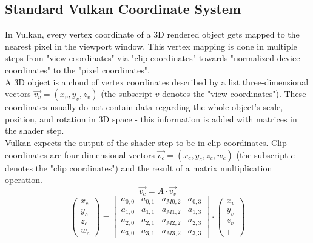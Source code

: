 \subsection{Standard Vulkan Coordinate System}
\label{sec:VulkanCoords}
In Vulkan, every vertex coordinate of a 3D rendered object gets mapped to the nearest pixel in the viewport window. This vertex mapping is done in multiple steps from "view coordinates" via "clip coordinates" towards "normalized device coordinates" to the "pixel coordinates".\\
A 3D object is a cloud of vertex coordinates described by a list three-dimensional vectors $\overrightarrow{v_{v}} = (x_{v},y_{v},z_{v})$ (the subscript $v$ denotes the "view coordinates"). These coordinates usually do not contain data regarding the whole object's scale, position, and rotation in 3D space - this information is added with matrices in the shader step.\\
Vulkan expects the output of the shader step to be in clip coordinates. Clip coordinates are four-dimensional vectors $\overrightarrow{v_{c}} = (x_{c},y_{c},z_{c},w_{c})$ (the subscript $c$ denotes the "clip coordinates") and the result of a matrix multiplication operation.\\
\begin{equation*}
    \overrightarrow{v_{c}} = A \cdot  \overrightarrow{v_{v}}
\end{equation*}
\begin{equation*}
    \begin{pmatrix}
        x_{c} \\
        y_{c} \\
        z_{c} \\
        w_{c}
    \end{pmatrix}
    =
    \begin{bmatrix}
        a_{0,0} & a_{0,1} & a_{M 0,2} & a_{0,3} \\
        a_{1,0} & a_{1,1} & a_{M 1,2} & a_{1,3} \\
        a_{2,0} & a_{2,1} & a_{M 2,2} & a_{2,3} \\
        a_{3,0} & a_{3,1} & a_{M 3,2} & a_{3,3}
    \end{bmatrix}
    \cdot
    \begin{pmatrix}
        x_{v} \\
        y_{v} \\
        z_{v} \\
        1
    \end{pmatrix}
\end{equation*}
